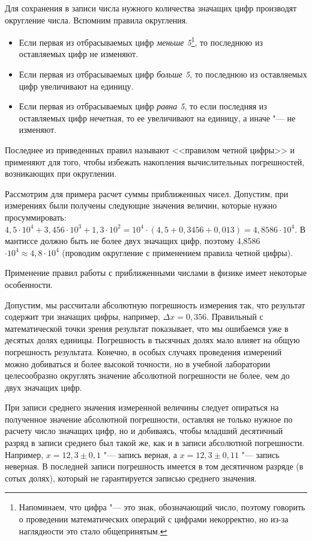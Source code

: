\documentclass[a4paper, 12pt]{extarticle}
\begin{document}
\pagebreak
Для сохранения в записи числа нужного количества значащих цифр производят округление числа. Вспомним правила округления.

\begin{itemize}
  \item Если первая из отбрасываемых цифр \emph{меньше 5}\footnote{Напоминаем, что цифра "--- это знак, обозначающий число, поэтому говорить о проведении математических операций с цифрами некорректно, но из-за наглядности это стало общепринятым. }, то последнюю из оставляемых цифр не изменяют.
  \item Если первая из отбрасываемых цифр \emph{больше 5}, то последнюю из оставляемых цифр увеличивают на единицу.
  \item Если первая из отбрасываемых цифр \emph{равна 5}, то если последняя из оставляемых цифр нечетная, то ее увеличивают на единицу, а иначе "--- не изменяют.
\end{itemize}
Последнее из приведенных правил называют <<правилом четной цифры>> и применяют для того, чтобы избежать накопления вычислительных погрешностей, возникающих при округлении.

Рассмотрим для примера расчет суммы приближенных чисел. Допустим, при измерениях были получены следующие значения величин, которые нужно просуммировать: $4,5 \cdot 10^4 + 3,456 \cdot 10^3 + 1,3 \cdot 10^2 = 10^4 \cdot (4,5 + 0,3456 + 0,013) = 4,8586 \cdot 10^4$. В мантиссе должно быть не более двух значащих цифр, поэтому 4,8586 $\cdot 10^4 \approx 4,8 \cdot 10^4$ (проводим округление с применением правила четной цифры).

Применение правил работы с приближенными числами в физике имеет некоторые особенности.

Допустим, мы рассчитали абсолютную погрешность измерения так, что результат содержит три значащих цифры, например, $\Delta x = 0,356$. Правильный с математической точки зрения результат показывает, что мы ошибаемся уже в десятых долях единицы. Погрешность в тысячных долях мало влияет на общую погрешность результата. Конечно, в особых случаях проведения измерений можно добиваться и более высокой точности, но в учебной лаборатории целесообразно округлять значение абсолютной погрешности не более, чем до двух значащих цифр.

При записи среднего значения измеренной величины следует опираться на полученное значение абсолютной погрешности, оставляя не только нужное по расчету число значащих цифр, но и добиваясь, чтобы младший десятичный разряд в записи среднего был такой же, как и в записи абсолютной погрешности. Например, $x = 12,3 \pm 0,1$ "--- запись верная, а $x = 12,3 \pm 0,11$ "--- запись неверная. В последней записи погрешность имеется в том десятичном разряде (в сотых долях), который не гарантируется записью среднего значения.
\end{document}

